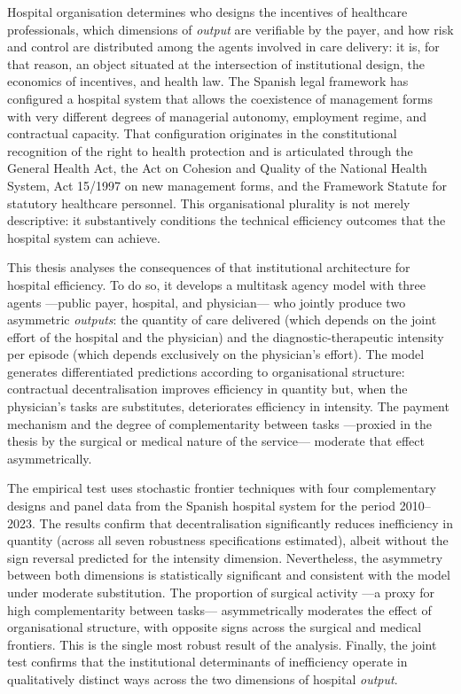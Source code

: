 Hospital organisation determines who designs the incentives of 
healthcare professionals, which dimensions of \textit{output} are 
verifiable by the payer, and how risk and control are distributed 
among the agents involved in care delivery: it is, for that reason, 
an object situated at the intersection of institutional design, 
the economics of incentives, and health law. The Spanish legal 
framework has configured a hospital system that allows the coexistence 
of management forms with very different degrees of managerial autonomy, 
employment regime, and contractual capacity. That configuration 
originates in the constitutional recognition of the right to health 
protection and is articulated through the General Health Act, the 
Act on Cohesion and Quality of the National Health System, Act 
15/1997 on new management forms, and the Framework Statute for 
statutory healthcare personnel. This organisational plurality is 
not merely descriptive: it substantively conditions the technical 
efficiency outcomes that the hospital system can achieve.

This thesis analyses the consequences of that institutional 
architecture for hospital efficiency. To do so, it develops a 
multitask agency model with three agents ---public payer, hospital, 
and physician--- who jointly produce two asymmetric \textit{outputs}: 
the quantity of care delivered (which depends on the joint effort 
of the hospital and the physician) and the diagnostic-therapeutic 
intensity per episode (which depends exclusively on the physician's 
effort). The model generates differentiated predictions according 
to organisational structure: contractual decentralisation improves 
efficiency in quantity but, when the physician's tasks are 
substitutes, deteriorates efficiency in intensity. The payment 
mechanism and the degree of complementarity between tasks ---proxied 
in the thesis by the surgical or medical nature of the service--- 
moderate that effect asymmetrically.

The empirical test uses stochastic frontier techniques with four 
complementary designs and panel data from the Spanish hospital 
system for the period 2010--2023. The results confirm that 
decentralisation significantly reduces inefficiency in quantity 
(across all seven robustness specifications estimated), albeit 
without the sign reversal predicted for the intensity dimension. 
Nevertheless, the asymmetry between both dimensions is statistically 
significant and consistent with the model under moderate substitution. 
The proportion of surgical activity ---a proxy for high 
complementarity between tasks--- asymmetrically moderates the 
effect of organisational structure, with opposite signs across 
the surgical and medical frontiers. This is the single most robust 
result of the analysis. Finally, the joint test confirms that the 
institutional determinants of inefficiency operate in qualitatively 
distinct ways across the two dimensions of hospital \textit{output}.

